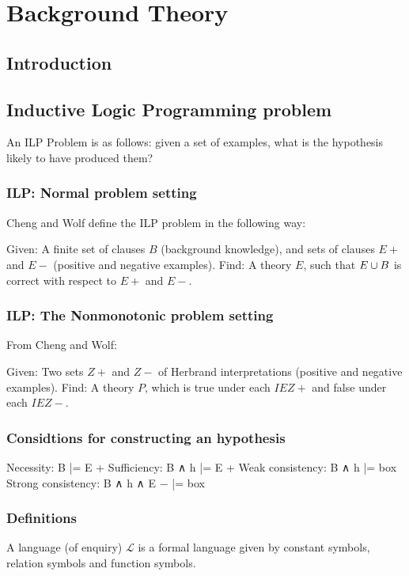 
\chapter{Background Theory}

\label{ch:background}

\section{Introduction}

\section{Inductive Logic Programming problem}

An ILP Problem is as follows: given a set of examples, what is the hypothesis likely to have produced them?

\subsection{ILP: Normal problem setting}
Cheng and Wolf define the ILP problem in the following way:

Given: A finite set of clauses $B$ (background knowledge), and sets of clauses $E+$ and $E-$ (positive and negative examples).
Find: A theory $E$, such that $E \cup B$ is correct with respect to $E+$ and $E-$.

\subsection{ILP: The Nonmonotonic problem setting}
From Cheng and Wolf:

Given: Two sets $Z+$ and $Z-$ of Herbrand interpretations (positive and negative examples).
Find: A theory $P$, which is true under each $I E Z+$ and false
under each $I E Z-$.

\subsection{Considtions for constructing an hypothesis}
Necessity: B |= E +
Sufficiency: B ∧ h |= E +
Weak consistency: B ∧ h |= box
Strong consistency: B ∧ h ∧ E − |= box

\subsection{Definitions}

A language (of enquiry) $\mathcal{L}$ is a formal language given by constant symbols, relation symbols and function symbols.



